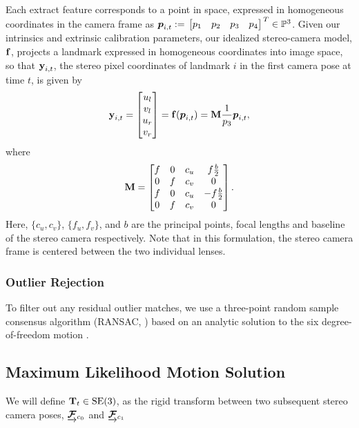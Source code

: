 Each extract feature corresponds to a
point in space, expressed in homogeneous coordinates in the camera frame as
$\HomogeneousPoint{i}{t} := \Transpose{\bbm p_1 & p_2 & p_3 & p_4 \ebm} \in
\HomogeneousNumbers[3]$.  Given our intrinsics and extrinsic calibration parameters, our idealized stereo-camera model, $\boldsymbol{\mathbf{f}}$,
projects a landmark expressed in homogeneous coordinates into image space, so
that $\boldsymbol{\mathbf{y}}_{i, t}$, the stereo pixel coordinates of landmark $i$ in the first camera pose at time $t$, is given
by 
\begin{equation}
	\boldsymbol{\mathbf{y}}_{i, t} = \begin{bmatrix} u_l \\ v_l \\ u_r \\ v_r \end{bmatrix} 
  = \boldsymbol{\mathbf{f}}(\boldsymbol{p}_{i,t}) 
  = \boldsymbol{\mathbf{M}} \frac{1}{p_3}\boldsymbol{p}_{i,t},
\end{equation}
where
\begin{equation}
 \boldsymbol{\mathbf{M}} = \begin{bmatrix} f & 0 & c_u & f \frac{b}{2} \\ 0 & f & c_v & 0 \\ f 
                        & 0 & c_u & -f\frac{b}{2} \\ 0 & f & c_v & 0 \end{bmatrix}.
\end{equation}
Here, $\{c_u, c_v\}$, $\{f_u, f_v\}$, and $b$ are the principal points, focal
lengths and baseline of the stereo camera respectively. Note that in this
formulation, the stereo camera frame is centered between the two individual
lenses. 


\subsubsection{Outlier Rejection}

To filter out any residual outlier matches, we use a three-point random sample consensus algorithm (RANSAC, \cite{fischler1981random}) based on an analytic solution to the six degree-of-freedom motion \citep{Umeyama1991-ws}.
  
\subsection{Maximum Likelihood Motion Solution}
We will define $\boldsymbol{\mathbf{T}}_t \in\text{SE}(3)$, as the rigid transform between two subsequent stereo camera poses, 
$\underrightarrow{ \boldsymbol{\mathbf{\mathcal{F}}} }_{c_0}$ and  $\underrightarrow{ \boldsymbol{\mathbf{\mathcal{F}}} }_{c_1}$

